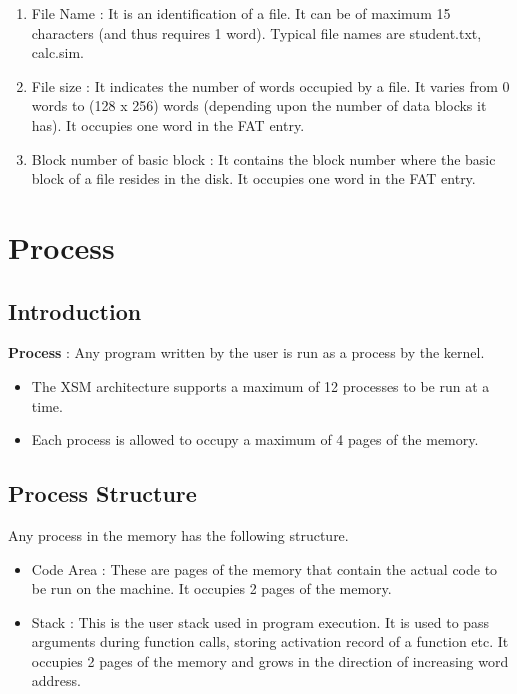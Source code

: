 \documentclass[11pt]{article}
\begin{document}
\begin{enumerate}
\item File Name : It is an identification of a file. It can be of maximum 15 characters (and thus requires 1 word). Typical file names are student.txt, calc.sim.
\item File size : It indicates the number of words occupied by a file. It varies from 0 words to (128 x 256) words (depending upon the number of data blocks it has). It occupies one word in the FAT entry.
\item Block number of basic block : It contains the block number where the basic block of a file resides in the disk. It occupies one word in the FAT entry.
\end{enumerate}



\pagebreak

\section{Process}

\subsection{Introduction}
\textbf{Process} : Any program written by the user is run as a process by the kernel.
\begin{itemize}
\item The XSM architecture supports a maximum of 12 processes to be run at a time.
\item Each process is allowed to occupy a maximum of 4 pages of the memory.
\end{itemize}

\subsection{Process Structure}
Any process in the memory has the following structure.
\begin{itemize}
\item Code Area : These are pages of the memory that contain the actual code to be run on the machine. It occupies 2 pages of the memory.
\item Stack : This is the user stack used in program execution. It is used to pass arguments during function calls, storing activation record of a function etc. It occupies 2 pages of the memory and grows in the direction of increasing word address.
\end{itemize}
\end{document}
